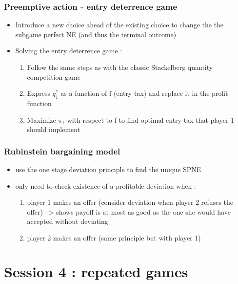 \documentclass{article}
\begin{document}
\subsubsection{Preemptive action - entry deterrence game}
\begin{itemize}
    \item Introduce a new choice ahead of the existing choice to change the the subgame perfect NE (and thus the terminal outcome)
    \item Solving the entry deterrence game : 
    \begin{enumerate}
        \item Follow the same steps as with the classic Stackelberg quantity competition game
        \item Express $q_1^*$ as a function of f (entry tax) and replace it in the profit function
        \item Maximize $\pi_1$ with respect to f to find optimal entry tax that player 1 should implement
    \end{enumerate}
\end{itemize}

\subsubsection{Rubinstein bargaining model}
\begin{itemize}
    \item use the one stage deviation principle to find the unique SPNE
    \item only need to check existence of a profitable deviation when : 
    \begin{enumerate}
        \item player 1 makes an offer (consider deviation when player 2 refuses the offer) --> shows payoff is at most as good as the one she would have accepted without deviating
        \item player 2 makes an offer (same principle but with player 1)
    \end{enumerate}
\end{itemize}


\section{Session 4 : repeated games}
    
\end{document}
